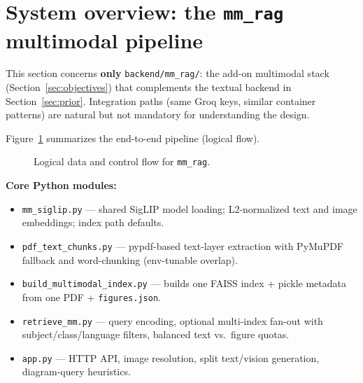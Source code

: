 \documentclass[11pt]{article}
\begin{document}
\section{System overview: the \texttt{mm\_rag} multimodal pipeline}
\label{sec:overview}

This section concerns \textbf{only} \texttt{backend/mm\_rag/}: the add-on multimodal stack (Section~\ref{sec:objectives}) that complements the textual backend in Section~\ref{sec:prior}. Integration paths (same Groq keys, similar container patterns) are natural but not mandatory for understanding the design.

Figure~\ref{fig:flow} summarizes the end-to-end pipeline (logical flow).

\begin{figure}[H]
\centering
{}
\caption{Logical data and control flow for \texttt{mm\_rag}.}
\label{fig:flow}
\end{figure}

\noindent
\textbf{Core Python modules:}
\begin{itemize}
  \item \texttt{mm\_siglip.py} --- shared SigLIP model loading; L2-normalized text and image embeddings; index path defaults.
  \item \texttt{pdf\_text\_chunks.py} --- pypdf-based text-layer extraction with PyMuPDF fallback and word-chunking (env-tunable overlap).
  \item \texttt{build\_multimodal\_index.py} --- builds one FAISS index + pickle metadata from one PDF + \texttt{figures.json}.
  \item \texttt{retrieve\_mm.py} --- query encoding, optional multi-index fan-out with subject/class/language filters, balanced text vs.\ figure quotas.
  \item \texttt{app.py} --- HTTP API, image resolution, split text/vision generation, diagram-query heuristics.
\end{itemize}
\end{document}

